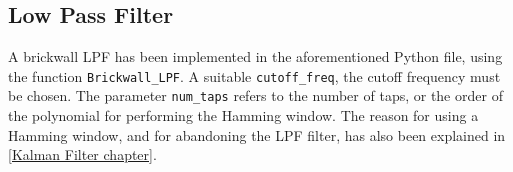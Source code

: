 \documentclass[oneside]{book}
\begin{document}
\subsection{Low Pass Filter}
A brickwall LPF has been implemented in the aforementioned Python file, using the function \verb|Brickwall_LPF|. A suitable \verb|cutoff_freq|, the cutoff frequency must be chosen. The parameter \verb|num_taps| refers to the number of taps, or the order of the polynomial for performing the Hamming window. The reason for using a Hamming window, and for abandoning the LPF filter, has also been explained in \autoref{Kalman Filter chapter}. 
\end{document}
